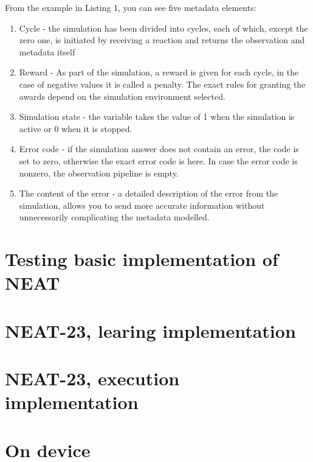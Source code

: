 From the example in Listing 1, you can see five metadata elements:
\begin{enumerate}
	\item Cycle - the simulation has been divided into cycles, each of which, 
		except the zero one, is initiated by receiving a reaction and returns the 
		observation and metadata itself
	\item Reward - As part of the simulation, a reward is given for each cycle, 
		in the case of negative values it is called a penalty. 
		The exact rules for granting the awards depend on the simulation environment selected. 
	\item Simulation state - the variable takes the value of 1 when the simulation is active or 
		0 when it is stopped.
	\item Error code - if the simulation answer does not contain an error, the code is set to zero,
		otherwise the exact error code is here. In case the error code is nonzero,
		the observation pipeline is empty.  
	\item The content of the error - a detailed description of the error from the simulation, 
		allows you to send more accurate information without unnecessarily complicating the 
		metadata modelled.
\end{enumerate}

\FloatBarrier
\section{Testing basic implementation of NEAT}

\FloatBarrier
\section{NEAT-23, learing implementation}

\FloatBarrier
\section{NEAT-23, execution implementation}

\FloatBarrier
\section{On device}
